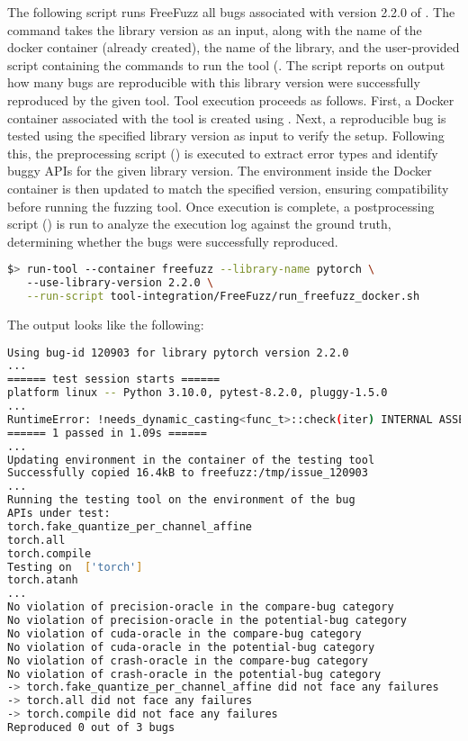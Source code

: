 \documentclass[sigconf,screen]{acmart}
\begin{document}
The following script runs FreeFuzz all bugs associated with version
2.2.0 of \torch.  The command  takes the library
version as an input, along with the name of the docker container
(already created), the name of the library, and the user-provided
script containing the commands to run the tool
(. The script reports on output how
many bugs are reproducible with this library version were successfully
reproduced by the given tool.  Tool execution proceeds as
follows. First, a Docker container associated with the tool is created using
. Next, a reproducible bug is tested using
the specified library version as input to verify the setup.
Following this, the preprocessing script () is executed 
to extract error types and identify buggy APIs for the given library version.
The environment inside the Docker container is then updated to match the specified version, 
ensuring compatibility before running the fuzzing tool. Once execution is complete, a postprocessing 
script () is run to analyze the execution log against the ground truth, 
determining whether the bugs were successfully reproduced.


\begin{lstlisting}[language=bash,basicstyle=\small,keywords={}]
$> run-tool --container freefuzz --library-name pytorch \ 
   --use-library-version 2.2.0 \
   --run-script tool-integration/FreeFuzz/run_freefuzz_docker.sh
\end{lstlisting}

The output looks like the following:

\begin{lstlisting}[language=bash,basicstyle=\small,keywords={}]
Using bug-id 120903 for library pytorch version 2.2.0
...
====== test session starts ======
platform linux -- Python 3.10.0, pytest-8.2.0, pluggy-1.5.0
...
RuntimeError: !needs_dynamic_casting<func_t>::check(iter) INTERNAL ASSERT FAILED at "../aten/src/ATen/native/cpu/Loops.h":310, please report a bug to PyTorch.
====== 1 passed in 1.09s ======
...
Updating environment in the container of the testing tool
Successfully copied 16.4kB to freefuzz:/tmp/issue_120903
...
Running the testing tool on the environment of the bug
APIs under test:
torch.fake_quantize_per_channel_affine
torch.all
torch.compile
Testing on  ['torch']
torch.atanh
...
No violation of precision-oracle in the compare-bug category
No violation of precision-oracle in the potential-bug category
No violation of cuda-oracle in the compare-bug category
No violation of cuda-oracle in the potential-bug category
No violation of crash-oracle in the compare-bug category
No violation of crash-oracle in the potential-bug category
-> torch.fake_quantize_per_channel_affine did not face any failures
-> torch.all did not face any failures
-> torch.compile did not face any failures
Reproduced 0 out of 3 bugs
\end{lstlisting}
\end{document}
